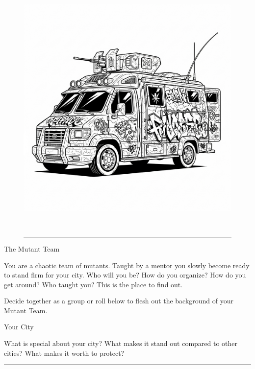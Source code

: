 
\vspace*{\fill}

\begin{figure}[h!]
\centering\includegraphics[height=13cm]{images/van.png}
\vspace{-\baselineskip}\vspace{+0.1pt}
\rule{\linewidth}{2pt}
\end{figure}
\Huge{}The Mutant Team

\normalfont\large
\medskip

You are a chaotic team of mutants. Taught by a mentor you slowly become ready to stand firm for your city. Who will you be? How do you organize? How do you get around? Who taught you? This is the place to find out.

\newpage

\normalfont\large
\medskip

Decide together as a group or roll below to flesh out the background of your Mutant Team.

\Large{}Your City
\normalfont\large
\medskip

What is special about your city? What makes it stand out compared to other cities? What makes it worth to protect? \rule{0.5\linewidth}{1pt}


